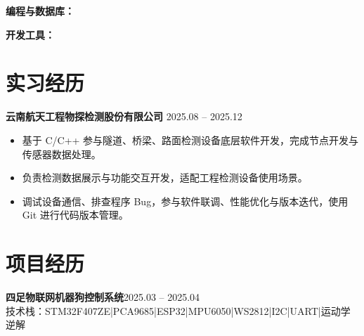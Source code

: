 \documentclass[10pt,a4paper]{article}
\newcommand{\projectblock}[3]{%
    {\bfseries\color{darktext}#1}\hfill{\color{graytext}#2}\\%
    {\small\color{graytext}#3}%
    \vspace{0.2em}%
}
\begin{document}
\vspace{2pt}

{\bfseries\color{primary}编程与数据库：}

\vspace{2pt}

{\bfseries\color{primary}开发工具：}

\section{\faBriefcase\hspace{0.4em}实习经历}

{\bfseries 云南航天工程物探检测股份有限公司}\hfill{\color{graytext} 2025.08 -- 2025.12}

\vspace{2pt}

\begin{itemize}[leftmargin=1.5em, itemsep=2pt, parsep=0pt, topsep=2pt]
    \item 基于 C/C++ 参与隧道、桥梁、路面检测设备底层软件开发，完成节点开发与传感器数据处理。
    \item 负责检测数据展示与功能交互开发，适配工程检测设备使用场景。
    \item 调试设备通信、排查程序 Bug，参与软件联调、性能优化与版本迭代，使用 Git 进行代码版本管理。
\end{itemize}

\vspace{0.15em}

\section{\faProjectDiagram\hspace{0.4em}项目经历}

\projectblock{四足物联网机器狗控制系统}{2025.03 -- 2025.04}{技术栈：STM32F407ZE\hspace{0.3em}|\hspace{0.3em}PCA9685\hspace{0.3em}|\hspace{0.3em}ESP32\hspace{0.3em}|\hspace{0.3em}MPU6050\hspace{0.3em}|\hspace{0.3em}WS2812\hspace{0.3em}|\hspace{0.3em}I2C\hspace{0.3em}|\hspace{0.3em}UART\hspace{0.3em}|\hspace{0.3em}运动学逆解}
\end{document}
